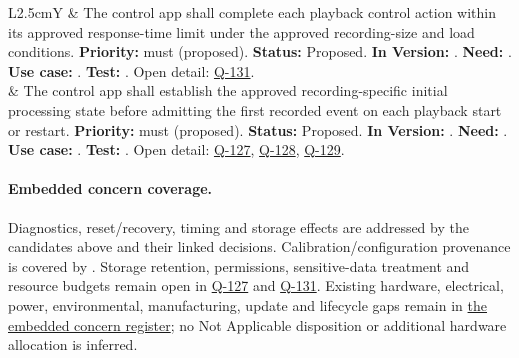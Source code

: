 \begin{tabularx}{\linewidth}{L{2.5cm}Y}
 & The control app shall complete each playback control action within its approved response-time limit under the approved recording-size and load conditions. \textbf{Priority:} \gls{must} (proposed). \textbf{Status:} Proposed. \textbf{In Version:} \NoVersion. \textbf{Need:} . \textbf{Use case:} . \textbf{Test:} . Open detail: \hyperref[Question:Q-131]{Q-131}.\\
 & The control app shall establish the approved recording-specific initial processing state before admitting the first recorded event on each playback start or restart. \textbf{Priority:} \gls{must} (proposed). \textbf{Status:} Proposed. \textbf{In Version:} \NoVersion. \textbf{Need:} . \textbf{Use case:} . \textbf{Test:} . Open detail: \hyperref[Question:Q-127]{Q-127}, \hyperref[Question:Q-128]{Q-128}, \hyperref[Question:Q-129]{Q-129}.\\
\end{tabularx}
\normalsize

\paragraph{Embedded concern coverage.}
Diagnostics, reset/recovery, timing and storage effects are addressed by the candidates above and their linked decisions. Calibration/configuration provenance is covered by . Storage retention, permissions, sensitive-data treatment and resource budgets remain open in \hyperref[Question:Q-127]{Q-127} and \hyperref[Question:Q-131]{Q-131}. Existing hardware, electrical, power, environmental, manufacturing, update and lifecycle gaps remain in \hyperref[Table:EmbeddedCoverage]{the embedded concern register}; no Not Applicable disposition or additional hardware allocation is inferred.
